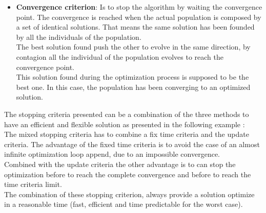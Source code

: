 \begin{itemize}
\item \textbf{Convergence criterion}: Is to stop the algorithm by waiting the convergence point. The convergence is reached when the actual population is composed by a set of identical solutions. That means the same solution has been founded by all the individuals of the population. \\
 The best solution found push the other to evolve in the same direction, by contagion all the individual of the population evolves to reach the convergence point. \\ 
 This solution found during the optimization process is supposed to be the best one. In this case, the population has been converging to an optimized solution.%
\end{itemize}

 The stopping criteria presented can be a combination of the three methods to have an efficient and flexible solution as presented in the following example :\\
The mixed stopping criteria has to combine a fix time criteria and the update criteria.
The advantage of the fixed time criteria is to avoid the case of an almost infinite optimization loop append, due to an impossible convergence.%
\\ %
Combined with the update criteria the other advantage is to can stop the optimization before to reach the complete convergence and before to reach the time criteria limit.\\
The combination of these stopping criterion, always provide a solution optimize in a reasonable time (fast, efficient and time predictable for the worst case). 

 
%



